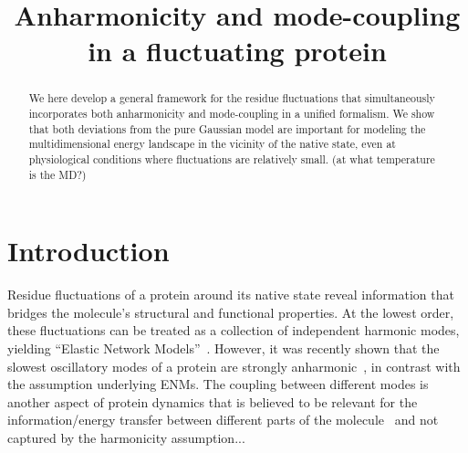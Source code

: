 \documentclass{article}
\begin{document}
\title{Anharmonicity and mode-coupling in a fluctuating protein}

\author{}


\begin{abstract}
We here develop a general framework for the residue
fluctuations that simultaneously incorporates both anharmonicity and
mode-coupling in a unified formalism. We show that both deviations
from the pure Gaussian model are important for modeling the
multidimensional energy landscape in the vicinity of the native state,
even at physiological conditions where fluctuations are relatively
small. (at what temperature is the MD?)

\end{abstract}


\maketitle

\section{Introduction}
Residue fluctuations of a protein around its native state reveal
information that bridges the molecule's structural and functional
properties.  At the lowest order, these fluctuations can be treated as
a collection of independent harmonic modes, yielding ``Elastic Network
Models''~\cite{ENM}. However, it was recently shown that the slowest
oscillatory modes of a protein are strongly
anharmonic~\cite{Yogurtcu}, in contrast with the assumption underlying
ENMs. The coupling between different modes is another aspect of
protein dynamics that is believed to be relevant for the
information/energy transfer between different parts of the
molecule~\cite{mode_coupling_ref} and not captured by the harmonicity
assumption...
\end{document}
